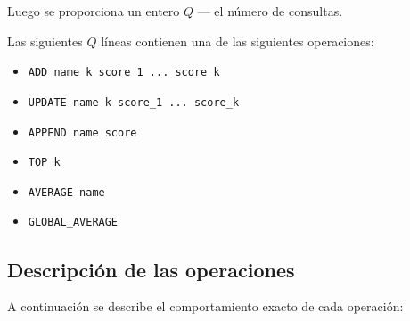 \documentclass[11pt,a4paper]{article}
\begin{document}
Luego se proporciona un entero $Q$ — el número de consultas.

Las siguientes $Q$ líneas contienen una de las siguientes operaciones:

\begin{itemize}
    \item \texttt{ADD name k score\_1 ... score\_k}
    \item \texttt{UPDATE name k score\_1 ... score\_k}
    \item \texttt{APPEND name score}
    \item \texttt{TOP k}
    \item \texttt{AVERAGE name}
    \item \texttt{GLOBAL\_AVERAGE}
\end{itemize}

\subsection*{Descripción de las operaciones}

A continuación se describe el comportamiento exacto de cada operación:
\end{document}
